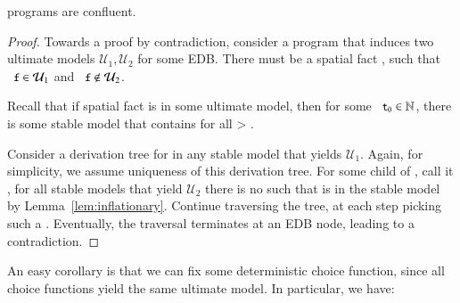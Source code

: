 \begin{theorem}
\label{thm:confluence}
\slang programs are confluent.
\end{theorem}
\begin{proof}

Towards a proof by contradiction, consider a \slang program that 
induces two ultimate models $\mathcal{U}_1, \mathcal{U}_2$ for some EDB.  There must be a spatial fact , such that 
$\dedalus{f} \in \mathcal{U}_1$ and $\dedalus{f} \not\in \mathcal{U}_2$.

Recall that if spatial fact  is in some ultimate model, then for some $\dedalus{t\sub{0}} \in \mathbb{N}$, there is some stable model that contains  for all  > .

Consider a derivation tree for  in any stable model that yields $\mathcal{U}_1$.  Again, for simplicity, we assume uniqueness of this derivation tree.  For some child of , call it , for all stable models that yield $\mathcal{U}_2$ there is no  such that  is in the stable model by Lemma~\ref{lem:inflationary}.  Continue traversing the tree, at each step picking such a .  Eventually, the traversal terminates at an EDB node, leading to a contradiction.
\end{proof}

An easy corollary is that we can fix some deterministic choice function, since all choice functions yield the same ultimate model.  In particular, we have:

